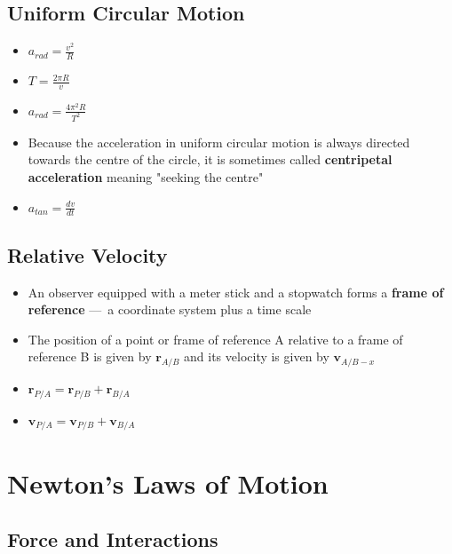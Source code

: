\documentclass{article}
\begin{document}
\setcounter{subsection}{3}
\subsection{Uniform Circular Motion}

\begin{itemize}
  \item $a_{rad}=\frac{v^2}{R}$

  \item $T=\frac{2\pi R}{v}$

  \item $a_{rad}=\frac{4\pi^2R}{T^2}$

  \item Because the acceleration in uniform circular motion is always directed towards the centre of the circle, it is sometimes called \textbf{centripetal acceleration} meaning "seeking the centre"

  \item $a_{tan}=\frac{dv}{dt}$
\end{itemize}

\subsection{Relative Velocity}

\begin{itemize}
  \item An observer equipped with a meter stick and a stopwatch forms a \textbf{frame of reference} — a coordinate system plus a time scale

  \item The position of a point or frame of reference A relative to a frame of reference B is given by $\mathbf{r}_{A/B}$ and its velocity is given by $\mathbf{v}_{A/B-x}$

  \item $\mathbf{r}_{P/A}=\mathbf{r}_{P/B}+\mathbf{r}_{B/A}$

  \item $\mathbf{v}_{P/A}=\mathbf{v}_{P/B}+\mathbf{v}_{B/A}$
\end{itemize}

\section{Newton's Laws of Motion}

\subsection{Force and Interactions}
\end{document}
